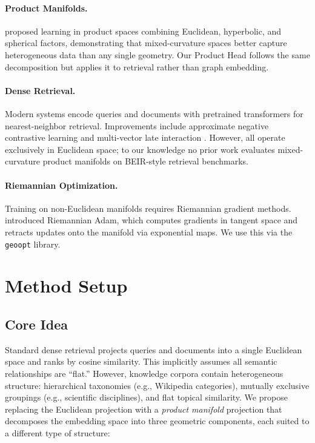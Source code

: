 \documentclass{article}
\begin{document}
\paragraph{Product Manifolds.}
\citet{gu2019learning} proposed learning in product spaces combining Euclidean, hyperbolic, and spherical factors, demonstrating that mixed-curvature spaces better capture heterogeneous data than any single geometry. Our Product Head follows the same decomposition but applies it to retrieval rather than graph embedding.

\paragraph{Dense Retrieval.}
Modern systems \citep{karpukhin2020dense, izacard2022unsupervised} encode queries and documents with pretrained transformers for nearest-neighbor retrieval. Improvements include approximate negative contrastive learning \citep{xiong2021approximate} and multi-vector late interaction \citep{khattab2020colbert}. However, all operate exclusively in Euclidean space; to our knowledge no prior work evaluates mixed-curvature product manifolds on BEIR-style retrieval benchmarks.

\paragraph{Riemannian Optimization.}
Training on non-Euclidean manifolds requires Riemannian gradient methods. \citet{becigneul2019riemannian} introduced Riemannian Adam, which computes gradients in tangent space and retracts updates onto the manifold via exponential maps. We use this via the \texttt{geoopt} library.

\section{Method Setup}
\label{sec:method}

\subsection{Core Idea}

Standard dense retrieval projects queries and documents into a single Euclidean space and ranks by cosine similarity. This implicitly assumes all semantic relationships are ``flat.'' However, knowledge corpora contain heterogeneous structure: hierarchical taxonomies (e.g., Wikipedia categories), mutually exclusive groupings (e.g., scientific disciplines), and flat topical similarity. We propose replacing the Euclidean projection with a \emph{product manifold} projection that decomposes the embedding space into three geometric components, each suited to a different type of structure:
\end{document}
